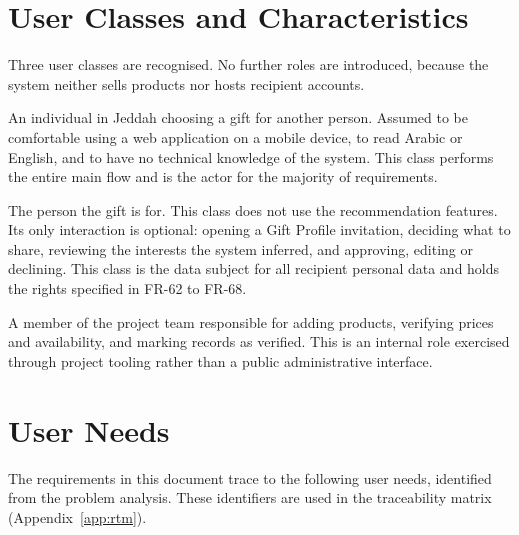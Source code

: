 \documentclass[11pt,a4paper]{report}
\begin{document}
\section{User Classes and Characteristics}
Three user classes are recognised. No further roles are introduced, because the system
neither sells products nor hosts recipient accounts.

\begin{description}[style=nextline,leftmargin=0pt]
  \item[UC-1 --- Gift giver (primary user)]
        An individual in Jeddah choosing a gift for another person. Assumed to be comfortable
        using a web application on a mobile device, to read Arabic or English, and to have no
        technical knowledge of the system. This class performs the entire main flow and is
        the actor for the majority of requirements.
  \item[UC-2 --- Gift recipient (consenting data subject)]
        The person the gift is for. This class does not use the recommendation features. Its
        only interaction is optional: opening a Gift Profile invitation, deciding what to
        share, reviewing the interests the system inferred, and approving, editing or
        declining. This class is the data subject for all recipient personal data and holds
        the rights specified in FR-62 to FR-68.
  \item[UC-3 --- Catalogue maintainer (project team role)]
        A member of the project team responsible for adding products, verifying prices and
        availability, and marking records as verified. This is an internal role exercised
        through project tooling rather than a public administrative interface.
\end{description}

\section{User Needs}
\label{sec:needs}
The requirements in this document trace to the following user needs, identified from the
problem analysis. These identifiers are used in the traceability matrix
(Appendix~\ref{app:rtm}).
\end{document}
